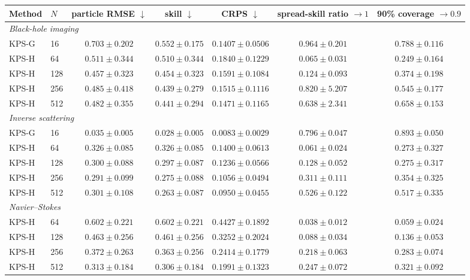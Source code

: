\small
\begin{tabular}{llccccc}
\toprule
Method & $N$ & \shortstack{particle\\RMSE $\downarrow$} & \shortstack{skill\\$\downarrow$} & \shortstack{CRPS\\$\downarrow$} & \shortstack{spread-skill\\ratio $\to 1$} & \shortstack{90\% coverage\\$\to 0.9$} \\
\midrule
\multicolumn{7}{l}{\itshape Black-hole imaging} \\
KPS-G & 16 & $0.703 \pm 0.202$ & $0.552 \pm 0.175$ & $0.1407 \pm 0.0506$ & $0.964 \pm 0.201$ & $0.788 \pm 0.116$ \\
KPS-H & 64 & $0.511 \pm 0.344$ & $0.510 \pm 0.344$ & $0.1840 \pm 0.1229$ & $0.065 \pm 0.031$ & $0.249 \pm 0.164$ \\
KPS-H & 128 & $0.457 \pm 0.323$ & $0.454 \pm 0.323$ & $0.1591 \pm 0.1084$ & $0.124 \pm 0.093$ & $0.374 \pm 0.198$ \\
KPS-H & 256 & $0.485 \pm 0.418$ & $0.439 \pm 0.279$ & $0.1515 \pm 0.1116$ & $0.820 \pm 5.207$ & $0.545 \pm 0.177$ \\
KPS-H & 512 & $0.482 \pm 0.355$ & $0.441 \pm 0.294$ & $0.1471 \pm 0.1165$ & $0.638 \pm 2.341$ & $0.658 \pm 0.153$ \\
\midrule
\multicolumn{7}{l}{\itshape Inverse scattering} \\
KPS-G & 16 & $0.035 \pm 0.005$ & $0.028 \pm 0.005$ & $0.0083 \pm 0.0029$ & $0.796 \pm 0.047$ & $0.893 \pm 0.050$ \\
KPS-H & 64 & $0.326 \pm 0.085$ & $0.326 \pm 0.085$ & $0.1400 \pm 0.0613$ & $0.061 \pm 0.024$ & $0.273 \pm 0.327$ \\
KPS-H & 128 & $0.300 \pm 0.088$ & $0.297 \pm 0.087$ & $0.1236 \pm 0.0566$ & $0.128 \pm 0.052$ & $0.275 \pm 0.317$ \\
KPS-H & 256 & $0.291 \pm 0.099$ & $0.275 \pm 0.088$ & $0.1056 \pm 0.0494$ & $0.311 \pm 0.111$ & $0.354 \pm 0.325$ \\
KPS-H & 512 & $0.301 \pm 0.108$ & $0.263 \pm 0.087$ & $0.0950 \pm 0.0455$ & $0.526 \pm 0.122$ & $0.517 \pm 0.335$ \\
\midrule
\multicolumn{7}{l}{\itshape Navier--Stokes} \\
KPS-H & 64 & $0.602 \pm 0.221$ & $0.602 \pm 0.221$ & $0.4427 \pm 0.1892$ & $0.038 \pm 0.012$ & $0.059 \pm 0.024$ \\
KPS-H & 128 & $0.463 \pm 0.256$ & $0.461 \pm 0.256$ & $0.3252 \pm 0.2024$ & $0.088 \pm 0.034$ & $0.136 \pm 0.053$ \\
KPS-H & 256 & $0.372 \pm 0.263$ & $0.363 \pm 0.256$ & $0.2414 \pm 0.1779$ & $0.218 \pm 0.063$ & $0.283 \pm 0.074$ \\
KPS-H & 512 & $0.313 \pm 0.184$ & $0.306 \pm 0.184$ & $0.1991 \pm 0.1323$ & $0.247 \pm 0.072$ & $0.321 \pm 0.092$ \\
\bottomrule
\end{tabular}
